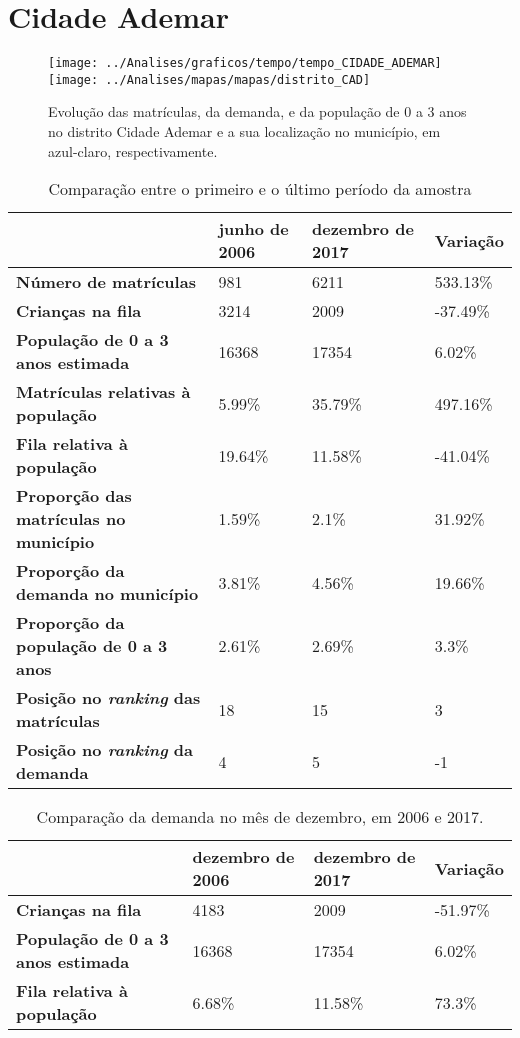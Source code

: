 \section{Cidade Ademar}
\begin{figure}[H]
\centering
\texttt{[image: ../Analises/graficos/tempo/tempo\_CIDADE\_ADEMAR]}
\texttt{[image: ../Analises/mapas/mapas/distrito\_CAD]}
\caption{Evolução das matrículas, da demanda, e da população de 0 a 3 anos no distrito Cidade Ademar e a sua localização no município, em azul-claro, respectivamente.}
\end{figure}
\begin{table}[H]
\begin{tabular}{l|l|l|l}
\textbf{}                                      & \textbf{junho de 2006}       & \textbf{dezembro de 2017}    & \textbf{Variação} \\ \hline
\textbf{Número de matrículas}                  & 981 & 6211 & 533.13\% \\ \hline
\textbf{Crianças na fila}                      & 3214 & 2009 & -37.49\% \\ \hline
\textbf{População de 0 a 3 anos estimada}      & 16368 & 17354 & 6.02\% \\ \hline
\textbf{Matrículas relativas à população}      & 5.99\% & 35.79\% & 497.16\% \\ \hline
\textbf{Fila relativa à população}             & 19.64\% & 11.58\% & -41.04\% \\ \hline
\textbf{Proporção das matrículas no município} & 1.59\% & 2.1\% & 31.92\% \\ \hline
\textbf{Proporção da demanda no município}     & 3.81\% & 4.56\% & 19.66\% \\ \hline
\textbf{Proporção da população de 0 a 3 anos}  & 2.61\% & 2.69\% & 3.3\% \\ \hline
\textbf{Posição no \textit{ranking} das matrículas}     & 18 & 15 & 3 \\ \hline
\textbf{Posição no \textit{ranking} da demanda}         & 4 & 5 & -1 \\ 
\end{tabular}
\caption{Comparação entre o primeiro e o último período da amostra}
\end{table}
\begin{table}[H]
\begin{tabular}{l|l|l|l}
\textbf{}                                 & \textbf{dezembro de 2006} & \textbf{dezembro de 2017} & \textbf{Variação} \\ \hline
\textbf{Crianças na fila}                      & 4183 & 2009 & -51.97\% \\ \hline
\textbf{População de 0 a 3 anos estimada}      & 16368 & 17354 & 6.02\% \\ \hline
\textbf{Fila relativa à população}             & 6.68\% & 11.58\% & 73.3\% \\
\end{tabular}
\caption{Comparação da demanda no mês de dezembro, em 2006 e 2017.}
\end{table}

